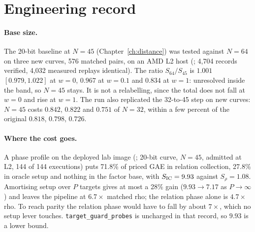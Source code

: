 \section{Engineering record}\label{sec:pg-engineering}

\paragraph{Base size.} The 20-bit baseline at $N=45$ (Chapter~\ref{ch:distance})
was tested against $N=64$ on three new curves, 576 matched pairs, on an AMD
L2 host (; 4{,}704 records verified,
4{,}032 measured replays identical). The ratio $S_{64}/S_{45}$ is $1.001$
$[0.979,1.022]$ at $w=0$, $0.967$ at $w=0.1$ and $0.834$ at $w=1$:
unresolved inside the band, so $N=45$ stays. It is not a relabelling,
since the total does not fall at $w=0$ and rise at $w=1$. The run also
replicated the 32-to-45 step on new curves: $N=45$ costs $0.842$, $0.822$
and $0.751$ of $N=32$, within a few percent of the original $0.818$,
$0.798$, $0.726$.

\paragraph{Where the cost goes.} A phase profile on the deployed lab image
(; 20-bit curve, $N=45$, admitted at L2,
144 of 144 executions) puts 71.8\% of priced GAE in relation collection,
27.8\% in oracle setup and nothing in the factor base, with $S_{\rm IC}=9.93$
against $S_\rho=1.08$. Amortising setup over $P$ targets gives at most a 28\%
gain ($9.93\to7.17$ as $P\to\infty$) and leaves the pipeline at $6.7\times$
matched rho; the relation phase alone is $4.7\times$ rho. To reach parity
the relation phase would have to fall by about $7\times$, which no setup
lever touches. \texttt{target\_guard\_probes} is uncharged in that record,
so $9.93$ is a lower bound.

